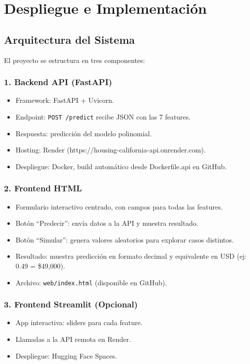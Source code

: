 \documentclass[11pt,a4paper]{article}
\begin{document}
\section{Despliegue e Implementación}

\subsection{Arquitectura del Sistema}

El proyecto se estructura en tres componentes:

\subsubsection{1. Backend API (FastAPI)}
\begin{itemize}
  \item Framework: FastAPI + Uvicorn.
  \item Endpoint: \texttt{POST /predict} recibe JSON con las 7 features.
  \item Respuesta: predicción del modelo polinomial.
  \item Hosting: Render (https://housing-california-api.onrender.com).
  \item Despliegue: Docker, build automático desde Dockerfile.api en GitHub.
\end{itemize}

\subsubsection{2. Frontend HTML}
\begin{itemize}
  \item Formulario interactivo centrado, con campos para todas las features.
  \item Botón ``Predecir'': envía datos a la API y muestra resultado.
  \item Botón ``Simular'': genera valores aleatorios para explorar casos distintos.
  \item Resultado: muestra predicción en formato decimal y equivalente en USD (ej: 0.49 = \$49,000).
  \item Archivo: \texttt{web/index.html} (disponible en GitHub).
\end{itemize}

\subsubsection{3. Frontend Streamlit (Opcional)}
\begin{itemize}
  \item App interactiva: sliders para cada feature.
  \item Llamadas a la API remota en Render.
  \item Despliegue: Hugging Face Spaces.
\end{itemize}
\end{document}
